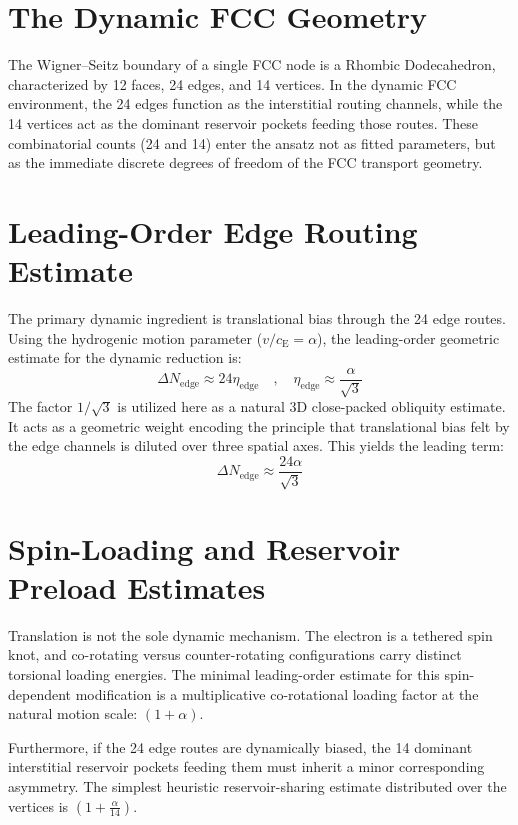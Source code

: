 \section{The Dynamic FCC Geometry}
The Wigner--Seitz boundary of a single FCC node is a Rhombic Dodecahedron, characterized by 12 faces, 24 edges, and 14 vertices. In the dynamic FCC environment, the 24 edges function as the interstitial routing channels, while the 14 vertices act as the dominant reservoir pockets feeding those routes. These combinatorial counts (24 and 14) enter the ansatz not as fitted parameters, but as the immediate discrete degrees of freedom of the FCC transport geometry.

\section{Leading-Order Edge Routing Estimate}
The primary dynamic ingredient is translational bias through the 24 edge routes. Using the hydrogenic motion parameter ($v/c_{\mathrm{E}} = \alpha$), the leading-order geometric estimate for the dynamic reduction is:
\begin{equation}
    \Delta N_{\mathrm{edge}} \approx 24 \eta_{\mathrm{edge}} \quad , \quad \eta_{\mathrm{edge}} \approx \frac{\alpha}{\sqrt{3}}
\end{equation}
The factor $1/\sqrt{3}$ is utilized here as a natural 3D close-packed obliquity estimate. It acts as a geometric weight encoding the principle that translational bias felt by the edge channels is diluted over three spatial axes. This yields the leading term:
\begin{equation}
    \Delta N_{\mathrm{edge}} \approx \frac{24\alpha}{\sqrt{3}}
\end{equation}

\section{Spin-Loading and Reservoir Preload Estimates}
Translation is not the sole dynamic mechanism. The electron is a tethered spin knot, and co-rotating versus counter-rotating configurations carry distinct torsional loading energies. The minimal leading-order estimate for this spin-dependent modification is a multiplicative co-rotational loading factor at the natural motion scale: $(1+\alpha)$.

Furthermore, if the 24 edge routes are dynamically biased, the 14 dominant interstitial reservoir pockets feeding them must inherit a minor corresponding asymmetry. The simplest heuristic reservoir-sharing estimate distributed over the vertices is $\left(1 + \frac{\alpha}{14}\right)$.

